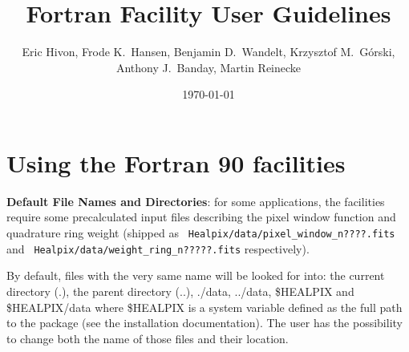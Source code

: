 \documentclass[12pt,twoside]{article}
\begin{document}
\title{\healpix Fortran Facility User Guidelines}
\author{Eric Hivon, Frode K.~Hansen, Benjamin D.~Wandelt, Krzysztof M.~G\'orski,
Anthony J.~Banday, Martin Reinecke}

\date{\today}

\frontpage
\tableofcontents
\newpage

\section{Using the \healpix Fortran 90 facilities}
\label{section:defdir}
{\bf {Default File Names and Directories}}: for some applications, the \healpix facilities
require some precalculated input files describing the pixel window
function and quadrature ring weight (shipped as {\tt
Healpix/data/pixel\_window\_n????.fits} and {\tt
Healpix/data/weight\_ring\_n?????.fits} respectively). \label{page:defdir}

By default, files with the very same name will be looked for into: the current directory (.), the parent directory (..),
./data, ../data, \$HEALPIX and \$HEALPIX/data where \$HEALPIX is
a system variable defined as the full path to the \healpix package
(see the installation documentation).
The user has the possibility to change both the name of those files
and their location.
\end{document}
